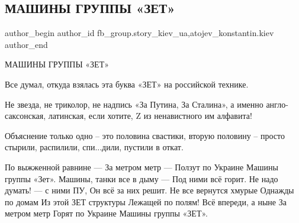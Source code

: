  
 
 
 
 
 
\subsection{МАШИНЫ ГРУППЫ «ЗЕТ»}
\label{sec:07_03_2022.fb.fb_group.story_kiev_ua.2.mashyny_gruppy_zet}
 
\ifcmt
 author_begin
   author_id fb_group.story_kiev_ua,atojev_konstantin.kiev
 author_end
\fi

МАШИНЫ ГРУППЫ «ЗЕТ»

Все думал, откуда взялась эта буква «ЗЕТ» на российской технике.

Не звезда, не триколор, не надпись «За Путина, За Сталина», а именно
англо-саксонская,  латинская, если хотите, Z из ненавистного им алфавита!


Объяснение только одно – это половина свастики, вторую половину – просто
стырили, распилили, спи...дили, пустили в откат.

\raggedcolumns
\begin{multicols}{2} %
\setlength{\parindent}{0pt}
\obeycr
По выжженной равнине —
За метром метр —
Ползут по Украине
Машины группы «Зет».
\smallskip
Машины, танки все в дыму —
Под ними всё горит.
Не надо думать! — с ними ПУ,
Он всё за них решит.
\smallskip
Не все вернутся хмурые
Однажды по домам
Из этой ЗЕТ структуры
Лежащей по полям!
\smallskip
Всё впереди, а ныне
За метром метр
Горят по Украине
Машины группы «ЗЕТ».
\restorecr
\end{multicols} %


